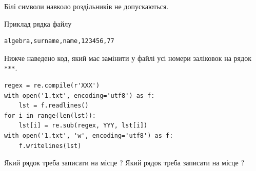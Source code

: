 \documentclass[12pt, ukrainian]{article}
\def\code#1{\Verb!#1!}
\begin{document}
{Білі символи навколо роздільників не допускаються.

Приклад рядка файлу



\begin{verbatim}
algebra,surname,name,123456,77
\end{verbatim}


Нижче наведено код, який має замінити у файлі усі номери заліковок на рядок \code{***}.



\begin{verbatim}
regex = re.compile(r'XXX')
with open('1.txt', encoding='utf8') as f:
    lst = f.readlines()
for i in range(len(lst)):
    lst[i] = re.sub(regex, YYY, lst[i])
with open('1.txt', 'w', encoding='utf8') as f:
    f.writelines(lst)
\end{verbatim}





Який рядок треба записати на місце  ?
Який рядок треба записати на місце  ?\par

}
\newpage
\end{document}
